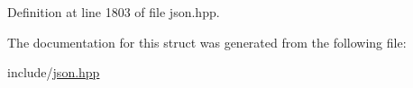 Definition at line 1803 of file json.\+hpp.



The documentation for this struct was generated from the following file\+:\begin{DoxyCompactItemize}
\item 
include/\hyperlink{json_8hpp}{json.\+hpp}\end{DoxyCompactItemize}
